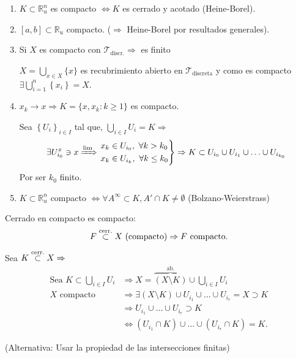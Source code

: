 \begin{ej}
\begin{enumerate}
    \item $K \subset \mathbb{R}_u^n$ es compacto $\Leftrightarrow K$ es cerrado y acotado (Heine-Borel). 
    \item $\left[ a, b \right] \subset \mathbb{R}_u$ compacto. ($\Rightarrow$ Heine-Borel por resultados generales).
    \item Si $X$ es compacto con $\mathcal{T}_{\text{discr.}} \Rightarrow$ es finito 
    \begin{demo}
        $X = \bigcup_{x \in X} \{x\}$ es recubrimiento abierto en $\mathcal{T}_{\text{discreta}}$ y como es compacto $\exists \bigcup_{i=1}^n \left\{ x_i \right\} = X$.
    \end{demo}
    \item $x_k \rightarrow x \Rightarrow K = \{x, x_k: k \ge 1\}$ es compacto.
    \begin{demo}
        Sea $\left\{ U_i \right\}_{i \in I}$ tal que, $\bigcup_{i \in I} U_i = K \Rightarrow$
        \[
            \exists U_{i_0}^x \ni x \xRightarrow{\lim} \begin{rcases}
                x_k \in U_{i_0},\ \forall k > k_0\\
                x_k \in U_{i_k},\ \forall k \le k_0
            \end{rcases} \Rightarrow K \subset U_{i_0} \cup U_{i_1} \cup \ldots \cup U_{i_{k_0}} 
        \]
        Por ser $k_0$ finito.
    \end{demo}

    \item $K \subset \mathbb{R}_u^n$ compacto $\Leftrightarrow \forall A^{\infty} \subset K, A' \cap K \neq \emptyset$ (Bolzano-Weierstrass)
\end{enumerate}
\end{ej}

\begin{prop}[Mantra 1]
Cerrado en compacto es compacto: 
\[
F \stackrel{\text{cerr.}}{\subset} X \text{ (compacto)}\Rightarrow F \text{ compacto.}
\]
\end{prop}
\begin{demo}
Sea $K \stackrel{\text{cerr.}}{\subset} X \Rightarrow$
\begin{align*}
    \text{Sea } K \subset \bigcup_{i \in I} U_i &\Rightarrow X = \overbrace{\left( X \setminus K \right)}^{\text{ab.}} \cup \bigcup_{i \in I} U_i\\
    X \text{ compacto} &\Rightarrow \exists \left( X \setminus K \right) \cup U_{i_1} \cup \ldots \cup U_{i_r} = X \supset K\\
    &\Rightarrow U_{i_1} \cup \ldots \cup U_{i_r} \supset K\\ 
    &\Leftrightarrow \left( U_{i_1} \cap K \right) \cup \ldots \cup \left( U_{i_r} \cap K \right) = K
.\end{align*}

(Alternativa: Usar la propiedad de las intersecciones finitas)
\end{demo}

